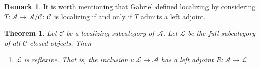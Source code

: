\documentclass[11pt]{amsart}
\numberwithin{equation}{section}
\theoremstyle{plain} %
\newtheorem{thm}[equation]{Theorem}
\theoremstyle{definition}
\newtheorem{rmk}[equation]{Remark}
\newcommand{\Cat}[1]{\mathcal{#1}}
\renewcommand{\to}{\longrightarrow}
\begin{document}
\begin{rmk}
It is worth mentioning that Gabriel defined localizing by 
considering $T: \Cat{A} \to \Cat{A}/\Cat{C}$: $\Cat{C}$ is 
localizing if and only if $T$ admits a left adjoint.
\end{rmk}

\begin{thm}
Let $\Cat{C}$ be a localizing subcategory of $\Cat{A}$. Let
$\Cat{L}$ be the full subcategory of all $\Cat{C}$-closed objects.
Then
\begin{enumerate}
\item $\Cat{L}$ is reflexive. That is, the inclusion $i: \Cat{L}
\to \Cat{A}$ has a left adjoint $R: \Cat{A} \to \Cat{L}$.

\end{enumerate}
\end{thm}
\end{document}

